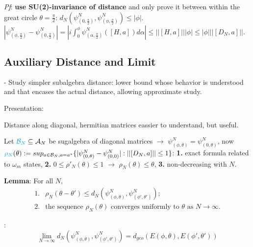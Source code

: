 \textit{Pf}: \textbf{use SU(2)-invariance of distance} and only prove it between within the great circle $\theta = \frac{\pi}{2}$: $d_N(\psi^N_{(0, \frac{\pi}{2})}, \psi^N_{(\phi, \frac{\pi}{2})}) \leq |\phi|$. 
$|\psi^N_{(\phi, \frac{\pi}{2})} - \psi^N_{(0, \frac{\pi}{2})}| = |i \int_0^\phi \psi^N_{(\alpha, \frac{\pi}{2})}([H, a]) d\alpha | \leq ||[H, a]|| |\phi| \leq |\phi| ||[D_N, a]||$.

\linea

\subsection{Auxiliary Distance and Limit}
 - Study simpler subalgebra distance: lower bound whose behavior is understood and that encases the actual distance, allowing approximate study.

Presentation:

Distance along diagonal, hermitian matrices eassier to understand, but useful.

Let $\textcolor{cyan}{\mathcal B_N} \subseteq \mathcal A_N$ be sugalgebra of diagonal matrices $\xrightarrow{}$ $\psi^N_{(\phi, \theta)} = \psi^N_{(0, \theta)}$, now 
$\textcolor{cyan}{\rho_N}(\theta) := sup_{a \in \mathcal B_N, a = a^*}\{|\psi^N_{(0, \theta)} - \psi^N_{(0, 0)}| : ||[D_N, a]|| \leq 1\}$: \textbf{1.} exact formula related to $\omega_m$ states, \textbf{2.} $0 \leq \rho'_N(\theta) \leq 1$ $\xrightarrow{}$ $\rho_N(\theta) \leq \theta$, \textbf{3.} non-decreasing with $N$.


\textbf{Lemma}: For all $N$, 
\begin{align*}
    1.& \rho_N(\theta - \theta') \leq d_N(\psi^N_{(\phi, \theta)}, \psi^N_{(\phi', \theta')})  ; \\
    2.& \text{the sequence $\rho_N(\theta)$ converges uniformly to $\theta$ as $N\to \infty$}.
\end{align*}

\textbf{}:  
\begin{equation}
        \lim_{N \to \infty} d_N(\psi^N_{(\phi, \theta)}, \psi^N_{(\phi', \theta')}) = d_{geo}(E(\phi, \theta), E(\phi', \theta'))
\end{equation}

